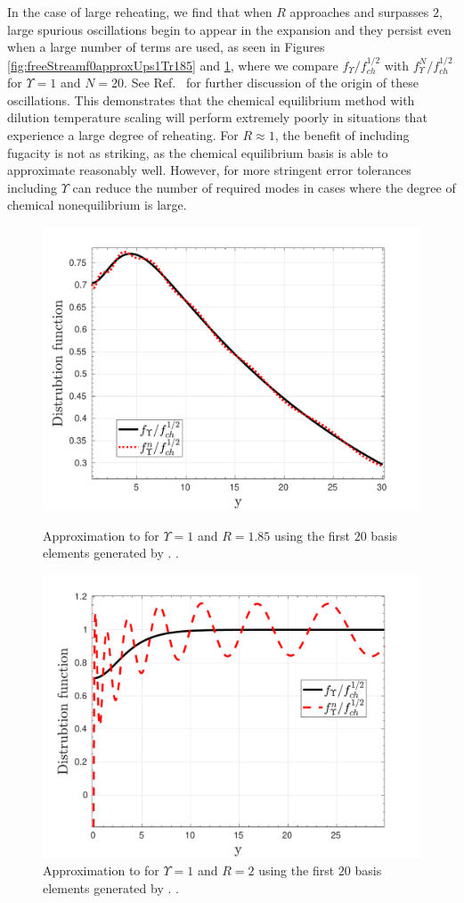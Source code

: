  In the case of large reheating, we find that when $R$ approaches and surpasses $2$, large spurious oscillations begin to appear in the expansion and they persist even when a large number of terms are used, as seen in Figures  \ref{fig:freeStreamf0approxUps1Tr185} and \ref{fig:freeStreamf0approxUps1Tr2}, where we compare $f_\Upsilon/f_{ch}^{1/2}$ with $f_{\Upsilon}^N/f_{ch}^{1/2}$ for $\Upsilon=1$ and $N=20$. See Ref.~\cite{Birrell:2014gea} for further discussion of the origin of these oscillations. This demonstrates that the chemical equilibrium method with dilution temperature scaling will  perform extremely poorly in situations that experience a large degree of reheating. For $R\approx 1$, the benefit of including fugacity is not as striking, as the chemical equilibrium basis is able to approximate  reasonably well.  However, for more stringent error tolerances including $\Upsilon$ can reduce the number of required modes in cases where the degree of chemical nonequilibrium is large.
\begin{figure}[ht]
\centerline{\includegraphics[width=0.8\linewidth]{06-appendix/SpectralMethodBoltzmann/Figures/free_stream_f0_approx_Ups_1_T_r_1_85_n_20.pdf}}
\caption{Approximation to  for $\Upsilon=1$ and $R=1.85$ using the first $20$ basis elements generated by . .}\label{fig:freeStreamf0approxUps1Tr185}
 \centerline{\includegraphics[width=0.8\linewidth]{06-appendix/SpectralMethodBoltzmann/Figures/free_stream_f0_approx_Ups_1_T_r_2_n_20.pdf}}
\caption{Approximation to  for $\Upsilon=1$ and $R=2$ using the first $20$ basis elements generated by . .}\label{fig:freeStreamf0approxUps1Tr2}
\end{figure}
